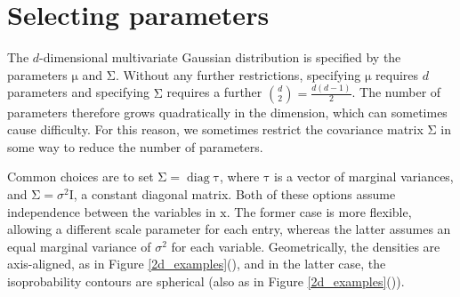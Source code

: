 \documentclass{article}
\newcommand{\mat}[1]{\bm{\mathrm{#1}}}
\renewcommand{\vec}[1]{\bm{\mathrm{#1}}}
\DeclareMathOperator{\diag}{diag}
\begin{document}
\section*{Selecting parameters}

The $d$-dimensional multivariate Gaussian distribution is specified by
the parameters $\vec{\mu}$ and $\mat{\Sigma}$.  Without any further
restrictions, specifying $\vec{\mu}$ requires $d$ parameters and
specifying $\mat{\Sigma}$ requires a further $\binom{d}{2} = \frac{d(d
  -1)}{2}$.  The number of parameters therefore grows quadratically in
the dimension, which can sometimes cause difficulty.  For this reason,
we sometimes restrict the covariance matrix $\vec{\Sigma}$ in some way
to reduce the number of parameters.

Common choices are to set $\mat{\Sigma} = \diag \vec{\tau}$, where
$\vec{\tau}$ is a vector of marginal variances, and $\mat{\Sigma} =
\sigma^2 \mat{I}$, a constant diagonal matrix.  Both of these options
assume independence between the variables in $\vec{x}$.  The former
case is more flexible, allowing a different scale parameter for each
entry, whereas the latter assumes an equal marginal variance of
$\sigma^2$ for each variable.  Geometrically, the densities are
axis-aligned, as in Figure \ref{2d_examples}(),
and in the latter case, the isoprobability contours are spherical
(also as in Figure \ref{2d_examples}()).
\end{document}
